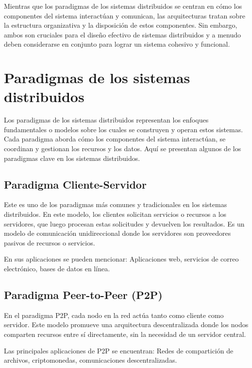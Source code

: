 \begin{tcolorbox}[colback=yellow!10!white, colframe=blue!50!black, title=Resumiendo, coltitle=white]
	Mientras que los paradigmas de los sistemas distribuidos se centran en cómo los componentes del sistema interactúan y comunican, las arquitecturas tratan sobre la estructura organizativa y la disposición de estos componentes. Sin embargo, ambos son cruciales para el diseño efectivo de sistemas distribuidos y a menudo deben considerarse en conjunto para lograr un sistema cohesivo y funcional.
\end{tcolorbox}

\section{Paradigmas de los sistemas distribuidos}
Los paradigmas de los sistemas distribuidos representan los enfoques fundamentales o modelos sobre los cuales se construyen y operan estos sistemas. Cada paradigma aborda cómo los componentes del sistema interactúan, se coordinan y gestionan los recursos y los datos. Aquí se presentan algunos de los paradigmas clave en los sistemas distribuidos.

\subsection{Paradigma Cliente-Servidor}

Este es uno de los paradigmas más comunes y tradicionales en los sistemas distribuidos. En este modelo, los clientes solicitan servicios o recursos a los servidores, que luego procesan estas solicitudes y devuelven los resultados. Es un modelo de comunicación unidireccional donde los servidores son proveedores pasivos de recursos o servicios.

En sus aplicaciones se pueden mencionar: Aplicaciones web, servicios de correo electrónico, bases de datos en línea.

\subsection{Paradigma Peer-to-Peer (P2P)}
En el paradigma P2P, cada nodo en la red actúa tanto como cliente como servidor. Este modelo promueve una arquitectura descentralizada donde los nodos comparten recursos entre sí directamente, sin la necesidad de un servidor central.

Las principales aplicaciones de P2P se encuentran: Redes de compartición de archivos, criptomonedas, comunicaciones descentralizadas.

